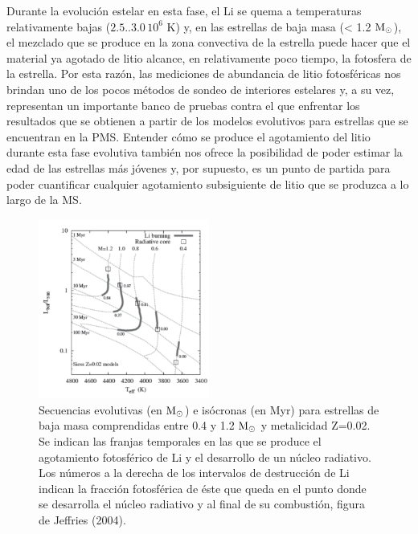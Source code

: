 Durante la evolución estelar en esta fase, el Li se quema a temperaturas relativamente bajas ($2.5..3.0 \, 10^{6}$ K) y, en las estrellas de baja masa (< 1.2 $\mathrm{M}_\odot$), el mezclado que se produce en la zona convectiva de la estrella puede hacer que el material ya agotado de litio alcance, en relativamente poco tiempo, la fotosfera de la estrella. Por esta razón, las mediciones de abundancia de litio fotosféricas nos brindan uno de los pocos métodos de sondeo de interiores estelares y, a su vez, representan un importante banco de pruebas contra el que enfrentar los resultados que se obtienen a partir de los modelos evolutivos para estrellas que se encuentran en la PMS. Entender cómo se produce el agotamiento del litio durante esta fase evolutiva también nos ofrece la posibilidad de poder estimar la edad de las estrellas más jóvenes y, por supuesto, es un punto de partida para poder cuantificar cualquier agotamiento subsiguiente de litio que se produzca a lo largo de la MS.\par

\begin{figure}
	\centering
	\includegraphics[width=0.5\textwidth]{img/tesis/isochrones.pdf}
	\caption {Secuencias evolutivas (en $\mathrm{M}_\odot$) e isócronas (en Myr) para estrellas de baja masa comprendidas entre 0.4 y 1.2 $\mathrm{M}_\odot$ y metalicidad Z=0.02. Se indican las franjas temporales en las que se produce el agotamiento fotosférico de Li y el desarrollo de un núcleo radiativo. Los números a la derecha de los intervalos de destrucción de Li indican la fracción fotosférica de éste que queda en el punto donde se desarrolla el núcleo radiativo y al final de su combustión, figura de Jeffries (2004).}
	\label{fig:isocrhones}
\end{figure}

